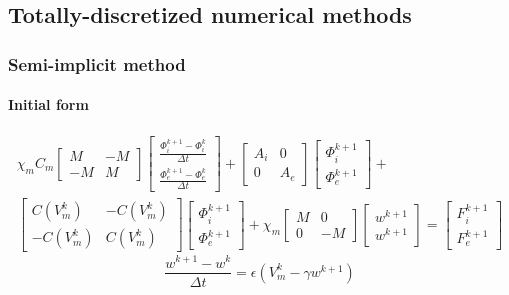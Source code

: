 \documentclass[a4paper]{article}
\begin{document}
\subsection{Totally-discretized numerical methods}
\vspace{4mm}
\subsubsection{Semi-implicit method}
\paragraph{Initial form}
\begin{equation}
\begin{gathered}
\chi_mC_m \begin{bmatrix}M &-M \\ -M & M \end{bmatrix}
\begin{bmatrix}\frac{\Phi_i^{k+1}-\Phi_i^k}{\Delta t} \\ \frac{\Phi_e^{k+1}-\Phi_e^k}{\Delta t} \end{bmatrix}
+ \begin{bmatrix}A_i & 0 \\ 0 & A_e \end{bmatrix}
\begin{bmatrix}\Phi_i^{k+1} \\ \Phi_e^{k+1} \end{bmatrix} + \\
 \begin{bmatrix}C(V_m^k) & -C(V_m^k) \\ -C(V_m^k) & C(V_m^k) \end{bmatrix} 
\begin{bmatrix} \Phi_i^{k+1} \\ \Phi_e^{k+1}  \end{bmatrix} 
+\chi_m \begin{bmatrix}M & 0 \\ 0 & -M \end{bmatrix} 
\begin{bmatrix}w^{k+1} \\ w^{k+1} \end{bmatrix} = 
\begin{bmatrix} F_i^{k+1} \\ F_e^{k+1}\end{bmatrix}
\end{gathered}
\end{equation}
\vspace{5mm}
\begin{equation}
\frac{w^{k+1}-w^k}{\Delta t} = \epsilon (V_m^k - \gamma w^{k+1})
\end{equation}
\end{document}

